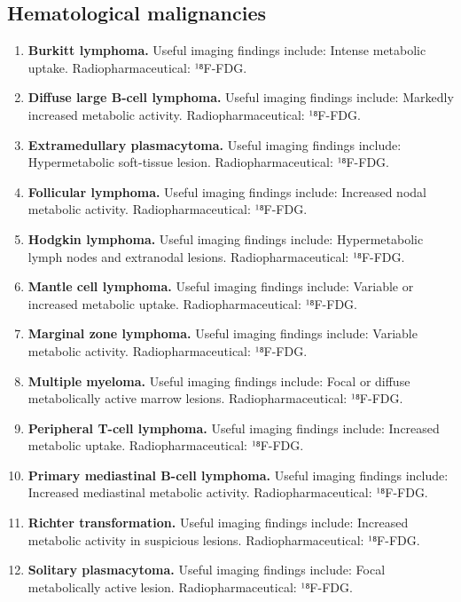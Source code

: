 \subsection{Hematological malignancies}
\begin{enumerate}[leftmargin=*,itemsep=0.45em,topsep=0.4em]
\item \textbf{Burkitt lymphoma.} Useful imaging findings include: Intense metabolic uptake. Radiopharmaceutical: ¹⁸F-FDG.
\item \textbf{Diffuse large B-cell lymphoma.} Useful imaging findings include: Markedly increased metabolic activity. Radiopharmaceutical: ¹⁸F-FDG.
\item \textbf{Extramedullary plasmacytoma.} Useful imaging findings include: Hypermetabolic soft-tissue lesion. Radiopharmaceutical: ¹⁸F-FDG.
\item \textbf{Follicular lymphoma.} Useful imaging findings include: Increased nodal metabolic activity. Radiopharmaceutical: ¹⁸F-FDG.
\item \textbf{Hodgkin lymphoma.} Useful imaging findings include: Hypermetabolic lymph nodes and extranodal lesions. Radiopharmaceutical: ¹⁸F-FDG.
\item \textbf{Mantle cell lymphoma.} Useful imaging findings include: Variable or increased metabolic uptake. Radiopharmaceutical: ¹⁸F-FDG.
\item \textbf{Marginal zone lymphoma.} Useful imaging findings include: Variable metabolic activity. Radiopharmaceutical: ¹⁸F-FDG.
\item \textbf{Multiple myeloma.} Useful imaging findings include: Focal or diffuse metabolically active marrow lesions. Radiopharmaceutical: ¹⁸F-FDG.
\item \textbf{Peripheral T-cell lymphoma.} Useful imaging findings include: Increased metabolic uptake. Radiopharmaceutical: ¹⁸F-FDG.
\item \textbf{Primary mediastinal B-cell lymphoma.} Useful imaging findings include: Increased mediastinal metabolic activity. Radiopharmaceutical: ¹⁸F-FDG.
\item \textbf{Richter transformation.} Useful imaging findings include: Increased metabolic activity in suspicious lesions. Radiopharmaceutical: ¹⁸F-FDG.
\item \textbf{Solitary plasmacytoma.} Useful imaging findings include: Focal metabolically active lesion. Radiopharmaceutical: ¹⁸F-FDG.
\end{enumerate}

